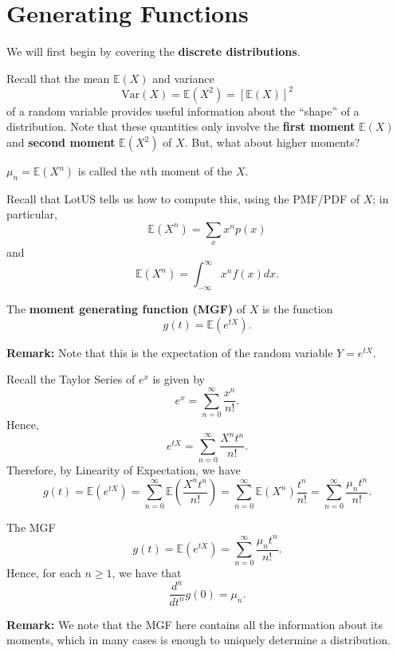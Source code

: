 \documentclass[letterpaper]{article}
\begin{document}
\section{Generating Functions}
We will first begin by covering the \textbf{discrete distributions}. 

\bigskip 

Recall that the mean $\mathbb{E}(X)$ and variance 
\[\text{Var}(X) = \mathbb{E}(X^2) = [\mathbb{E}(X)]^2\]
of a random variable provides useful information about the ``shape'' of a distribution. Note that these quantities only involve the \textbf{first moment} $\mathbb{E}(X)$ and \textbf{second moment} $\mathbb{E}(X^2)$ of $X$. But, what about higher moments? 

\begin{definition}{}{}
    $\mu_n = \mathbb{E}(X^n)$ is called the $n$th moment of the $X$.
\end{definition}
Recall that LotUS tells us how to compute this, using the PMF/PDF of $X$; in particular, 
\[\mathbb{E}(X^n) = \sum_x x^{n} p(x)\]
and 
\[\mathbb{E}(X^n) = \int_{-\infty}^{\infty} x^n f(x) dx.\]

\begin{definition}{}{}
    The \textbf{moment generating function (MGF)} of $X$ is the function 
    \[g(t) = \mathbb{E}(e^{tX}).\]
\end{definition}
\textbf{Remark:} Note that this is the expectation of the random variable $Y = e^{tX}$. 

\bigskip 

Recall the Taylor Series of $e^x$ is given by 
\[e^x = \sum_{n = 0}^{\infty} \frac{x^n}{n!}.\]
Hence, 
\[e^{tX} = \sum_{n = 0}^{\infty} \frac{X^n t^n}{n!}.\]
Therefore, by Linearity of Expectation, we have 
\[g(t) = \mathbb{E}(e^{tX}) = \sum_{n = 0}^{\infty} \mathbb{E}\left(\frac{X^n t^n}{n!}\right) = \sum_{n = 0}^{\infty} \mathbb{E}(X^n) \frac{t^n}{n!} = \sum_{n = 0}^{\infty} \frac{\mu_n t^n}{n!}.\]
\begin{theorem}{}{}
    The MGF \[g(t) = \mathbb{E}(e^{tX}) = \sum_{n = 0}^{\infty} \frac{\mu_n t^n}{n!}.\] Hence, for each $n \geq 1$, we have that \[\frac{d^n}{dt^n} g(0) = \mu_n.\]
\end{theorem}
\textbf{Remark:} We note that the MGF here contains all the information about its moments, which in many cases is enough to uniquely determine a distribution.
\end{document}
